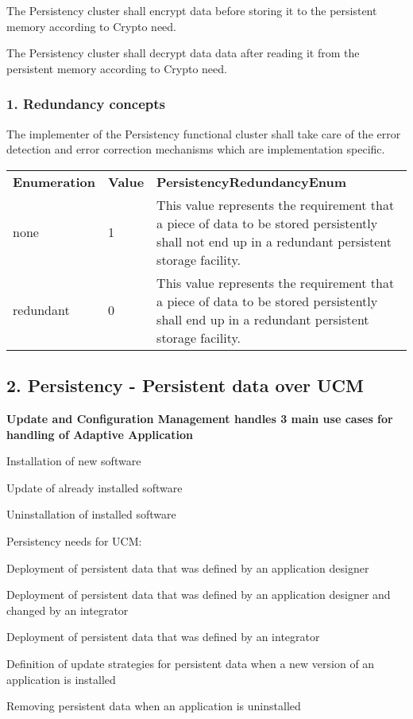 \begin{DoxyItemize}
\item The Persistency cluster shall encrypt data before storing it to the persistent memory according to Crypto need.
\item The Persistency cluster shall decrypt data data after reading it from the persistent memory according to Crypto need.
\end{DoxyItemize}

\subsubsection*{1. Redundancy concepts}

The implementer of the Persistency functional cluster shall take care of the error detection and error correction mechanisms which are implementation specific.

\tabulinesep=1mm
\begin{longtabu} spread 0pt [c]{*3{|X[-1]}|}
\hline
{\bfseries Enumeration} &{\bfseries Value} &{\bfseries Persistency\+Redundancy\+Enum}  \\
none&1&This value represents the requirement that a piece of data to be stored persistently shall not end up in a redundant persistent storage facility.  \\
redundant&0&This value represents the requirement that a piece of data to be stored persistently shall end up in a redundant persistent storage facility.\\
\end{longtabu}


\subsection*{2. Persistency -\/ Persistent data over U\+CM}

{\bfseries Update and Configuration Management handles 3 main use cases for handling of Adaptive Application}
\begin{DoxyItemize}
\item Installation of new software
\item Update of already installed software
\item Uninstallation of installed software
\end{DoxyItemize}

Persistency needs for U\+CM\+:
\begin{DoxyItemize}
\item Deployment of persistent data that was defined by an application designer
\item Deployment of persistent data that was defined by an application designer and changed by an integrator
\item Deployment of persistent data that was defined by an integrator
\item Definition of update strategies for persistent data when a new version of an application is installed
\item Removing persistent data when an application is uninstalled 
\end{DoxyItemize}

